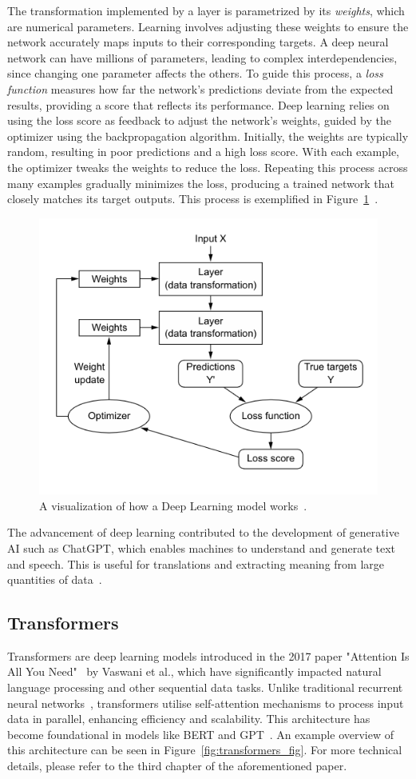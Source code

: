 \documentclass[licencjacka,en]{pracamgr}
\begin{document}
The transformation implemented by a layer is parametrized by its \textit{weights}, which are numerical parameters. Learning involves adjusting these weights to ensure the network accurately maps inputs to their corresponding targets. A deep neural network can have millions of parameters, leading to complex interdependencies, since changing one parameter affects the others. To guide this process, a \textit{loss function} measures how far the network's predictions deviate from the expected results, providing a score that reflects its performance. Deep learning relies on using the loss score as feedback to adjust the network's weights, guided by the optimizer using the backpropagation algorithm. Initially, the weights are typically random, resulting in poor predictions and a high loss score. With each example, the optimizer tweaks the weights to reduce the loss. Repeating this process across many examples gradually minimizes the loss, producing a trained network that closely matches its target outputs. This process is exemplified in Figure~\ref{fig:nn_function}~\cite{francuz_9}.

\begin{figure}
    \centering
    \includegraphics[width=0.5\linewidth]{bachelor_images/nn_function.png}
    \caption{A visualization of how a Deep Learning model works~\cite{francuz_9}.}
    \label{fig:nn_function}
\end{figure}

The advancement of deep learning contributed to the development of generative AI such as ChatGPT, which enables machines to understand and generate text and speech. This is useful for translations and extracting meaning from large quantities of data~\cite{ibm_dl}.

\subsection{Transformers}
Transformers are deep learning models introduced in the 2017 paper "Attention Is All You Need"~\cite{attention} by Vaswani et al., which have significantly impacted natural language processing and other sequential data tasks. Unlike traditional recurrent neural networks~\cite{RNN}, transformers utilise self-attention mechanisms to process input data in parallel, enhancing efficiency and scalability. This architecture has become foundational in models like BERT and GPT~\cite{medium_t}. An example overview of this architecture can be seen in Figure~\ref{fig:transformers_fig}. For more technical details, please refer to the third chapter of the aforementioned paper.
\end{document}
